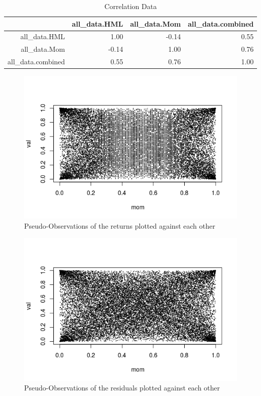 \documentclass[11pt,letterpaper]{memoir}
\begin{document}
\begin{table}[ht]
\centering
\caption{Correlation Data}
\begin{tabular}{rrrr}
  \hline
 & all\_data.HML & all\_data.Mom & all\_data.combined \\ 
  \hline
all\_data.HML & 1.00 & -0.14 & 0.55 \\ 
  all\_data.Mom & -0.14 & 1.00 & 0.76 \\ 
  all\_data.combined & 0.55 & 0.76 & 1.00 \\ 
   \hline
\end{tabular}
\end{table}

\begin{figure}
\includegraphics[scale=1]{obs}
\caption{Pseudo-Observations of the returns plotted against each other}
\end{figure}
\begin{figure}
\includegraphics[scale=1]{res}
\caption{Pseudo-Observations of the residuals plotted against each other}
\end{figure}
\end{document}
